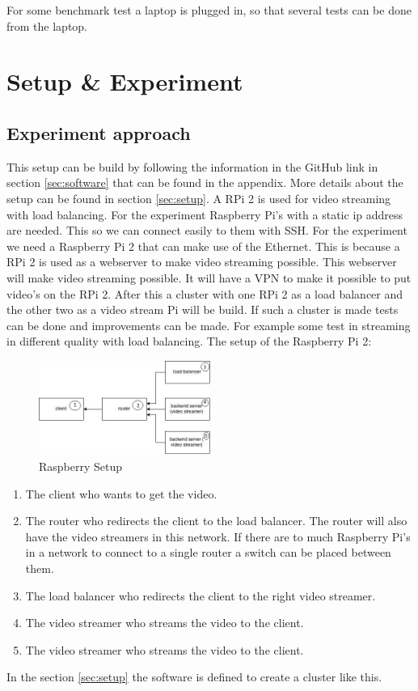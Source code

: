 \documentclass{sig-alternate-br}
\begin{document}
For some benchmark test a laptop is plugged in, so that several tests can be done from the laptop.


\section{Setup \& Experiment}\label{sec:setupex}


\subsection{Experiment approach}
This setup can be build by following the information in the GitHub link in section \ref{sec:software} that can be found in the appendix. More details about the setup can be found in section \ref{sec:setup}. \newline 
A RPi 2 is used for video streaming with load balancing. For the experiment Raspberry Pi's with a static ip address are needed. This so we can connect easily to them with SSH.  For the experiment we need a Raspberry Pi 2 that can make use of the Ethernet. This is because a RPi 2 is used as a webserver to make video streaming possible. This webserver will make video streaming possible. It will have a VPN to make it possible to put video's on the RPi 2. 
After this a cluster with one RPi 2 as a load balancer and the other two as a video stream Pi will be build. If such a cluster is made tests can be done and improvements can be made. For example some test in streaming in different quality with load balancing. The setup of the Raspberry Pi 2:

\begin{figure}[H]
	\centering 
	\includegraphics[width=0.5\textwidth]{raspsetup.jpg}
	\caption{Raspberry Setup}
	\label{fig:setup} %
\end{figure}
\begin{enumerate}[topsep=0pt,itemsep=-1ex,partopsep=1ex,parsep=1ex] 
\item The client who wants to get the video. 
\item The router who redirects the client to the load balancer. The router will also have the video streamers in this network. If there are to much Raspberry Pi's in a network to connect to a single router a switch can be placed between them. 
\item The load balancer who redirects the client to the right video streamer.
\item The video streamer who streams the video to the client.
\item The video streamer who streams the video to the client.
\end{enumerate}
In the section \ref{sec:setup} the software is defined to create a cluster like this.
\end{document}
